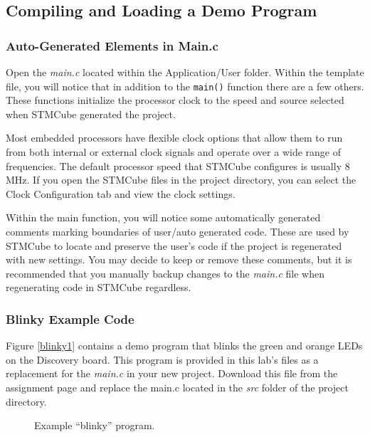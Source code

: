 \documentclass[11pt,fleqn]{book} %
\newcommand{\code}[3]{
    \begin{figure}[]
        \begin{center}
            \hspace*{-3.4cm}
            \colorbox{gray!20!white}{
                \parbox{0.8\paperwidth} {
                    
                }
            }
            \caption{#2}
            \label{#3}
        \end{center}
    \end{figure}
}
\begin{document}
\subsection{Compiling and Loading a Demo Program }
\subsubsection{Auto-Generated Elements in Main.c}
Open the \textit{main.c} located within the Application/User folder. Within the template file, you will notice that in addition to the \texttt{main()} function there are a few others. These functions initialize the processor clock to the speed and source selected when STMCube generated the project. 

Most embedded processors have flexible clock options that allow them to run from both internal or external clock signals and operate over a wide range of frequencies. The default processor speed that STMCube configures is usually 8 MHz. If you open the STMCube files in the project directory, you can select the Clock Configuration tab and view the clock settings.

Within the main function, you will notice some automatically generated comments marking boundaries of user/auto generated code. These are used by STMCube to locate and preserve the user's code if the project is regenerated with new settings. You may decide to keep or remove these comments, but it is recommended that you manually backup changes to the \textit{main.c} file when regenerating code in STMCube regardless. 

\subsubsection{Blinky Example Code}
Figure \vref{blinky1} contains a demo program that blinks the green and orange LEDs on the Discovery board. This program is provided in this lab's files as a replacement for the \textit{main.c} in your new project. Download this file from the assignment page and replace the main.c located in the \textit{src} folder of the project directory. 

%		

\code{./Files/blinky.c}{Example ``blinky'' program.}{blinky1}
\end{document}
